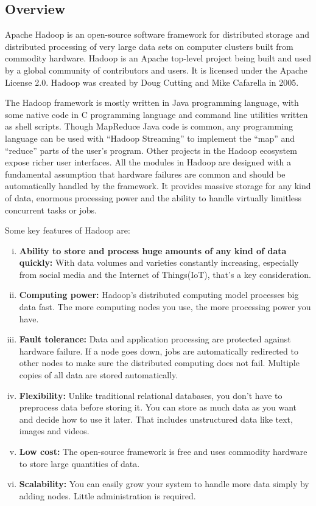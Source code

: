 \documentclass[a4paper,12pt,oneside]{report}
\begin{document}
\subsection{Overview}
Apache Hadoop is an open-source software framework for distributed storage
and distributed processing of very large data sets on computer clusters built from commodity
hardware.\cite{Apache} Hadoop is an Apache top-level project being built and used by a global
community of contributors and users. It is licensed under the Apache License 2.0.\cite{Introapache} 
Hadoop was created by Doug Cutting and Mike Cafarella in 2005.
\par The Hadoop framework is mostly written in Java programming language,
with some native code in C programming language and command line utilities
written as shell scripts. Though MapReduce Java code is common, any programming language can
be used with “Hadoop Streaming” to implement the “map” and “reduce” parts of the user’s program.\cite{Hadoopadventures}
Other projects in the Hadoop ecosystem expose richer user interfaces.
All the modules in Hadoop are designed with a fundamental assumption that
hardware failures are common and should be automatically handled by the framework.
It provides massive storage for any kind of data, enormous processing power and the ability to handle virtually
limitless concurrent tasks or jobs.
\par Some key features of Hadoop are:
\begin{enumerate}[(i)]
        \item \textbf{Ability to store and process huge amounts of any kind of data quickly:}
                With data volumes and varieties constantly increasing, especially from social media and the Internet of Things(IoT), that’s a key consideration.
        \item \textbf{Computing power:} Hadoop’s distributed computing model processes big data fast. The more computing nodes you use, the more processing power you have.
        \item \textbf{Fault tolerance:} Data and application processing are protected against hardware failure. If a node goes down, jobs are automatically redirected to other nodes to make sure the distributed computing does not fail. Multiple copies of all data are stored automatically.
        \item \textbf{Flexibility:} Unlike traditional relational databases, you don’t have to preprocess data before storing it. You can store as much data as you want and decide how to use it later. That includes unstructured data like text, images and videos.
        \item \textbf{Low cost:} The open-source framework is free and uses commodity hardware to store large quantities of data.
        \item \textbf{Scalability:} You can easily grow your system to handle more data simply by adding nodes. Little administration is required.
\end{enumerate}
\end{document}
